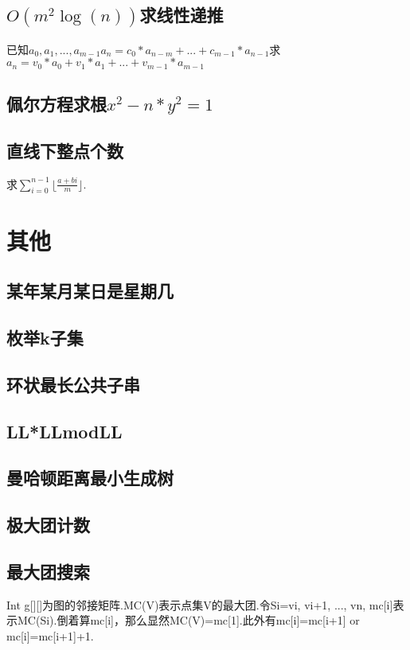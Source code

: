 \documentclass[landscape,a4paper]{article}
\begin{document}
\begin{spacing}{0.3}
\begin{multicols}{3}
	\subsection{$O(m^2 \log(n))$求线性递推}
	已知$a_0, a_1, ..., a_{m - 1}$$a_n = c_0 * a_{n - m} + ... + c_{m - 1} * a_{n - 1}$求$a_n = v_0 * a_0 + v_1 * a_1 + ... + v_{m - 1} * a_{m - 1}$
	
	\subsection{佩尔方程求根$x^2-n*y^2=1$}
	
	\subsection{直线下整点个数}
	求$\displaystyle\sum_{i=0}^{n-1} \lfloor\frac{a+bi}{m}\rfloor$.
	
	
	\section{其他}
	\subsection{某年某月某日是星期几}
	
	\subsection{枚举k子集}
	
	\subsection{环状最长公共子串}
	
	\subsection{LL*LLmodLL}
	
	\subsection{曼哈顿距离最小生成树}
	
	\subsection{极大团计数}
	
	\subsection{最大团搜索}
	Int g[][]为图的邻接矩阵.MC(V)表示点集V的最大团.令Si={vi, vi+1, ..., vn}, mc[i]表示MC(Si).倒着算mc[i]，那么显然MC(V)=mc[1].此外有mc[i]=mc[i+1] or mc[i]=mc[i+1]+1.
	

\end{multicols}
\end{spacing}
\end{document}
